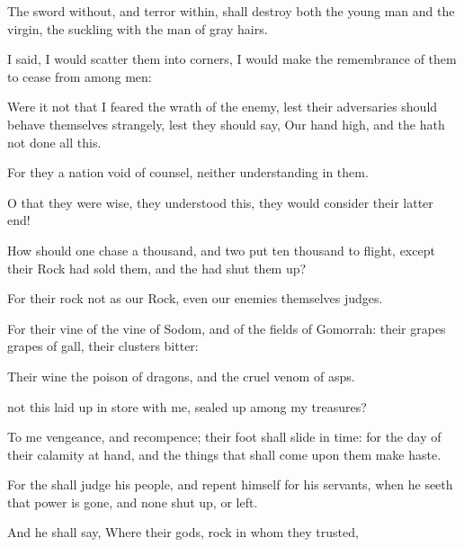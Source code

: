 {The
sword
without, and
terror
within, shall
destroy both the young
man and the
virgin, the
suckling
{} with the
man of gray
hairs.


\par }{\PP {}I
said, I would scatter them into
corners, I would make the
remembrance of them to
cease from among
men:

Were it
not that I
feared the
wrath of the
enemy, lest their
adversaries should behave themselves
strangely,
{} lest they should
say, Our
hand
{}
high, and the
{} hath not
done all this.

For they
{} a
nation
void of
counsel, neither
{}
understanding in them.

O
that they were
wise,
{} they
understood this,
{} they would
consider their latter
end!

How should
one
chase a
thousand, and
two put
ten
thousand to
flight,
except their
Rock had
sold
them, and the
{} had shut them
up?

For their
rock
{} not as our
Rock, even our
enemies themselves
{}
judges.

For their
vine
{} of the
vine of
Sodom, and of the
fields of
Gomorrah: their
grapes
{}
grapes of
gall, their
clusters
{}
bitter:

Their
wine
{} the
poison of
dragons, and the
cruel
venom of
asps.

 not this laid up in
store with me,
{} sealed
up among my
treasures?

To me
{}
vengeance, and
recompence; their
foot shall
slide in
{}
time: for the
day of their
calamity
{} at
hand, and the things that shall
come upon them make
haste.

For the
{} shall
judge his
people, and
repent himself for his
servants, when he
seeth that
{}
power is
gone, and
{}
none shut
up, or
left.

And he shall
say, Where
{} their
gods,
{}
rock in whom they
trusted,

}
